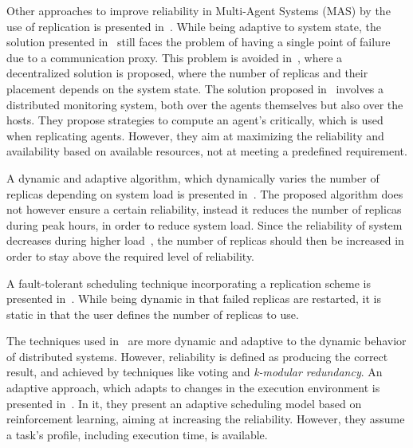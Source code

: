 \documentclass{cslthse-msc}
\begin{document}
Other approaches to improve reliability in Multi-Agent Systems (MAS) by the use of replication is presented in~\cite{replicatingAgents, adaptiveMASReplication, adaptiveAgentReplication}. While being adaptive to system state, the solution presented in~\cite{replicatingAgents} still faces the problem of having a single point of failure due to a communication proxy. This problem is avoided in~\cite{adaptiveMASReplication}, where a decentralized solution is proposed, where the number of replicas and their placement depends on the system state. %
The solution proposed in~\cite{adaptiveAgentReplication} involves a distributed monitoring system, both over the agents themselves but also over the hosts. They propose strategies to compute an agent's critically, which is used when replicating agents. However, they aim at maximizing the reliability and availability based on available resources, not at meeting a predefined requirement. %

A dynamic and adaptive algorithm, which dynamically varies the number of replicas depending on system load is presented in~\cite{adaptiveCheckPointAndRep}. The proposed algorithm does not however ensure a certain reliability, instead it reduces the number of replicas during peak hours, in order to reduce system load. Since the reliability of system decreases during higher load~\cite{studyOfFailures, implicationsOfFailures}, the number of replicas should then be increased in order to stay above the required level of reliability.

A fault-tolerant scheduling technique incorporating a replication scheme is presented in~\cite{faultTolerantSchedPolicy}. While being dynamic in that failed replicas are restarted, it is static in that the user defines the number of replicas to use.

The techniques used in~\cite{selfAdaptRel, dynAdaptRepl, relModelWebServices} are more dynamic and adaptive to the dynamic behavior of distributed systems. However, reliability is defined as producing the correct result, and achieved by techniques like voting and \emph{k-modular redundancy}.
An adaptive approach, which adapts to changes in the execution environment is presented in~\cite{imprRelAdaptRL}. In it, they present an adaptive scheduling model based on reinforcement learning, aiming at increasing the reliability. However, they assume a task's profile, including execution time, is available.
\end{document}

